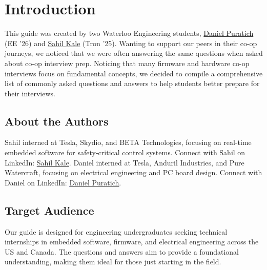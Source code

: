 \documentclass[main.tex]{subfiles}
\begin{document}
\section{Introduction}

This guide was created by two Waterloo Engineering students, \href{https://www.linkedin.com/in/danielpuratich}{Daniel Puratich} (EE '26) and \href{https://www.linkedin.com/in/sahil-kale}{Sahil Kale} (Tron '25). Wanting to support our peers in their co-op journeys, we noticed that we were often answering the same questions when asked about co-op interview prep. Noticing that many firmware and hardware co-op interviews focus on fundamental concepts, we decided to compile a comprehensive list of commonly asked questions and answers to help students better prepare for their interviews.

\subsection{About the Authors}
Sahil interned at Tesla, Skydio, and BETA Technologies, focusing on real-time embedded software for safety-critical control systems. Connect with Sahil on LinkedIn: \textcolor{blue}{\underline{\href{https://www.linkedin.com/in/sahil-kale}{Sahil Kale}}}.
\newline
\newline
Daniel interned at Tesla, Anduril Industries, and Pure Watercraft, focusing on electrical engineering and PC board design. Connect with Daniel on LinkedIn: \textcolor{blue}{\underline{\href{https://www.linkedin.com/in/danielpuratich}{Daniel Puratich}}}.

\subsection{Target Audience}
Our guide is designed for engineering undergraduates seeking technical internships in embedded software, firmware, and electrical engineering across the US and Canada. The questions and answers aim to provide a foundational understanding, making them ideal for those just starting in the field.
\end{document}
